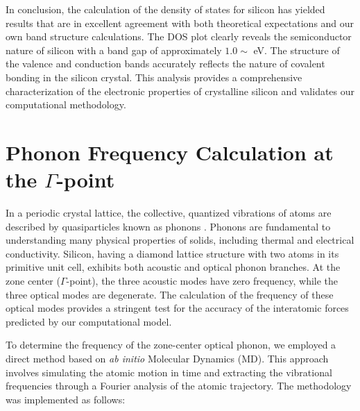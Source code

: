 \documentclass{article}
\begin{document}
In conclusion, the calculation of the density of states for silicon has yielded results that are in excellent agreement with both theoretical expectations and our own band structure calculations. The DOS plot clearly reveals the semiconductor nature of silicon with a band gap of approximately $1.0\sim$ eV. The structure of the valence and conduction bands accurately reflects the nature of covalent bonding in the silicon crystal. This analysis provides a comprehensive characterization of the electronic properties of crystalline silicon and validates our computational methodology.



\section{Phonon Frequency Calculation at the $\Gamma$-point}

In a periodic crystal lattice, the collective, quantized vibrations of atoms are described by quasiparticles known as phonons \cite{kittel_2005}. Phonons are fundamental to understanding many physical properties of solids, including thermal and electrical conductivity. Silicon, having a diamond lattice structure with two atoms in its primitive unit cell, exhibits both acoustic and optical phonon branches. At the zone center ($\Gamma$-point), the three acoustic modes have zero frequency, while the three optical modes are degenerate. The calculation of the frequency of these optical modes provides a stringent test for the accuracy of the interatomic forces predicted by our computational model.

To determine the frequency of the zone-center optical phonon, we employed a direct method based on \textit{ab initio} Molecular Dynamics (MD). This approach involves simulating the atomic motion in time and extracting the vibrational frequencies through a Fourier analysis of the atomic trajectory. The methodology was implemented as follows:
\end{document}
